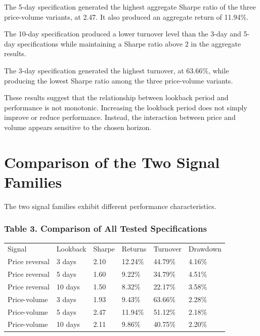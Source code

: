 \documentclass{article}
\begin{document}
The 5-day specification generated the highest aggregate Sharpe ratio of the three price-volume variants, at 2.47. It also produced an aggregate return of 11.94\%.

The 10-day specification produced a lower turnover level than the 3-day and 5-day specifications while maintaining a Sharpe ratio above 2 in the aggregate results.

The 3-day specification generated the highest turnover, at 63.66\%, while producing the lowest Sharpe ratio among the three price-volume variants.

These results suggest that the relationship between lookback period and performance is not monotonic. Increasing the lookback period does not simply improve or reduce performance. Instead, the interaction between price and volume appears sensitive to the chosen horizon.

\section{Comparison of the Two Signal Families}

The two signal families exhibit different performance characteristics.

\subsubsection{Table 3. Comparison of All Tested Specifications}

\begin{table}
\centering

\begin{tabular}{l l l l l l}
Signal & Lookback & Sharpe & Returns & Turnover & Drawdown \\

Price reversal & 3 days & 2.10 & 12.24\% & 44.79\% & 4.16\% \\
Price reversal & 5 days & 1.60 & 9.22\% & 34.79\% & 4.51\% \\
Price reversal & 10 days & 1.50 & 8.32\% & 22.17\% & 3.58\% \\
Price-volume & 3 days & 1.93 & 9.43\% & 63.66\% & 2.28\% \\
Price-volume & 5 days & 2.47 & 11.94\% & 51.12\% & 2.18\% \\
Price-volume & 10 days & 2.11 & 9.86\% & 40.75\% & 2.20\% \\

\end{tabular}

\end{table}
\end{document}
